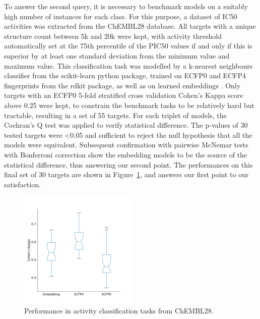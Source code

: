 \documentclass[journal=jacsat,manuscript=article]{achemso}
\begin{document}
To answer the second query, it is necessary to benchmark models on a suitably high number of instances for each class. For this purpose, a dataset of IC50 activities was extracted from the ChEMBL28 database. All targets with a unique structure count between 5k and 20k were kept, with activity threshold automatically set at the 75th percentile of the PIC50 values if and only if this is superior by at least one standard deviation from the minimum value and maximum value. This classification task was modelled by a k-nearest neighbours classifier from the scikit-learn python package\cite{scikit-learn}, trained on ECFP0 and ECFP4 fingerprints from the rdkit package\cite{LandrumRDKit}, as well as on learned embeddings . Only targets with an ECFP0 5-fold stratified cross validation Cohen's Kappa score above 0.25 were kept, to constrain the benchmark tasks to be relatively hard but tractable, resulting in a set of 55 targets. For each triplet of models, the Cochran's Q test was applied to verify statistical difference. The p-values of 30 tested targets were <0.05 and sufficient to reject the null hypothesis that all the models were equivalent. Subsequent confirmation with pairwise McNemar tests with Bonferroni correction show the embedding models to be the source of the statistical difference, thus answering our second point. The performances on this final set of 30 targets are shown in Figure~\ref{fig:Kappa_ChEMBL}, and answers our first point to our satisfaction.

\begin{figure}[hbtp]
\centering
\includegraphics[width=0.5\textwidth]{data/Kappa_ChEMBL.pdf}
\caption{Performance in activity classification tasks from ChEMBL28.}
\label{fig:Kappa_ChEMBL}
\end{figure}
\end{document}
